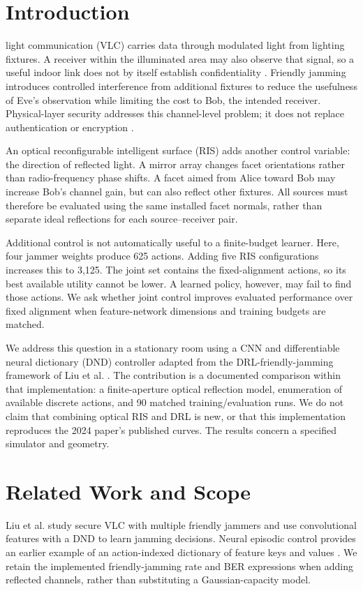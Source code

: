 \documentclass[journal,10pt,twocolumn]{IEEEtran}
\begin{document}
\section{Introduction}
 light communication (VLC) carries data through modulated light from lighting fixtures. A receiver within the illuminated area may also observe that signal, so a useful indoor link does not by itself establish confidentiality \cite{pathak2015visible,liu2024smart}. Friendly jamming introduces controlled interference from additional fixtures to reduce the usefulness of Eve's observation while limiting the cost to Bob, the intended receiver. Physical-layer security addresses this channel-level problem; it does not replace authentication or encryption \cite{bloch2008wireless}.

An optical reconfigurable intelligent surface (RIS) adds another control variable: the direction of reflected light. A mirror array changes facet orientations rather than radio-frequency phase shifts. A facet aimed from Alice toward Bob may increase Bob's channel gain, but can also reflect other fixtures. All sources must therefore be evaluated using the same installed facet normals, rather than separate ideal reflections for each source--receiver pair.

Additional control is not automatically useful to a finite-budget learner. Here, four jammer weights produce 625 actions. Adding five RIS configurations increases this to 3,125. The joint set contains the fixed-alignment actions, so its best available utility cannot be lower. A learned policy, however, may fail to find those actions. We ask whether joint control improves evaluated performance over fixed alignment when feature-network dimensions and training budgets are matched.

We address this question in a stationary room using a CNN and differentiable neural dictionary (DND) controller adapted from the DRL-friendly-jamming framework of Liu et al. \cite{liu2024smart}. The contribution is a documented comparison within that implementation: a finite-aperture optical reflection model, enumeration of available discrete actions, and 90 matched training/evaluation runs. We do not claim that combining optical RIS and DRL is new, or that this implementation reproduces the 2024 paper's published curves. The results concern a specified simulator and geometry.

\section{Related Work and Scope}
Liu et al. \cite{liu2024smart} study secure VLC with multiple friendly jammers and use convolutional features with a DND to learn jamming decisions. Neural episodic control provides an earlier example of an action-indexed dictionary of feature keys and values \cite{pritzel2017neural}. We retain the implemented friendly-jamming rate and BER expressions when adding reflected channels, rather than substituting a Gaussian-capacity model.
\end{document}
